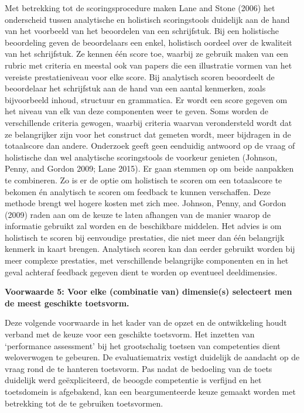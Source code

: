 \documentclass[
  letterpaper,
]{report}
\begin{document}
Met betrekking tot de scoringsprocedure maken Lane and Stone (2006) het
onderscheid tussen analytische en holistisch scoringstools duidelijk aan
de hand van het voorbeeld van het beoordelen van een schrijfstuk. Bij
een holistische beoordeling geven de beoordelaars een enkel, holistisch
oordeel over de kwaliteit van het schrijfstuk. Ze kennen één score toe,
waarbij ze gebruik maken van een rubric met criteria en meestal ook van
papers die een illustratie vormen van het vereiste prestatieniveau voor
elke score. Bij analytisch scoren beoordeelt de beoordelaar het
schrijfstuk aan de hand van een aantal kenmerken, zoals bijvoorbeeld
inhoud, structuur en grammatica. Er wordt een score gegeven om het
niveau van elk van deze componenten weer te geven. Soms worden de
verschillende criteria gewogen, waarbij criteria waarvan verondersteld
wordt dat ze belangrijker zijn voor het construct dat gemeten wordt,
meer bijdragen in de totaalscore dan andere. Onderzoek geeft geen
eenduidig antwoord op de vraag of holistische dan wel analytische
scoringstools de voorkeur genieten (Johnson, Penny, and Gordon 2009;
Lane 2015). Er gaan stemmen op om beide aanpakken te combineren. Zo is
er de optie om holistisch te scoren om een totaalscore te bekomen én
analytisch te scoren om feedback te kunnen verschaffen. Deze methode
brengt wel hogere kosten met zich mee. Johnson, Penny, and Gordon (2009)
raden aan om de keuze te laten afhangen van de manier waarop de
informatie gebruikt zal worden en de beschikbare middelen. Het advies is
om holistisch te scoren bij eenvoudige prestaties, die niet meer dan één
belangrijk kenmerk in kaart brengen. Analytisch scoren kan dan eerder
gebruikt worden bij meer complexe prestaties, met verschillende
belangrijke componenten en in het geval achteraf feedback gegeven dient
te worden op eventueel deeldimensies.

\textbf{Voorwaarde 5: Voor elke (combinatie van) dimensie(s) selecteert
men de meest geschikte toetsvorm.}

Deze volgende voorwaarde in het kader van de opzet en de ontwikkeling
houdt verband met de keuze voor een geschikte toetsvorm. Het inzetten
van `performance assessment' bij het grootschalig toetsen van
competenties dient weloverwogen te gebeuren. De evaluatiematrix vestigt
duidelijk de aandacht op de vraag rond de te hanteren toetsvorm. Pas
nadat de bedoeling van de toets duidelijk werd geëxpliciteerd, de
beoogde competentie is verfijnd en het toetsdomein is afgebakend, kan
een beargumenteerde keuze gemaakt worden met betrekking tot de te
gebruiken toetsvormen.
\end{document}
